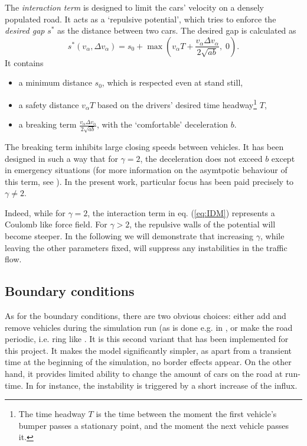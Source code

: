 The \emph{interaction term} is designed to limit the cars' velocity on a densely populated road. It acts as a `repulsive potential', which tries to enforce the \emph{desired gap} $s^*$ as the distance between two cars. The desired gap is calculated as
\begin{equation}
s^*(v_\alpha, \Delta v_\alpha) = s_0 + \max\left(v_\alpha T + \frac{v_\alpha \Delta v_\alpha}{2\sqrt{ab}},\;0\right).
\label{eq:desired_gap}
\end{equation}
It contains
\begin{itemize}
    \item a minimum distance $s_0$, which is respected even at stand still,
    \item a safety distance $v_\alpha T$ based on the drivers' desired time headway\footnote{The time headway $T$ is the time between the moment the first vehicle's bumper passes a stationary point, and the moment the next vehicle passes it.} $T$,
    \item a breaking term $\frac{v_\alpha \Delta v_\alpha}{2\sqrt{ab}}$, with the `comfortable' deceleration $b$.
\end{itemize}
The breaking term inhibits large closing speeds between vehicles. It has been designed in such a way that for $\gamma = 2$, the deceleration does not exceed $b$ except in emergency situations (for more information on the asymtpotic behaviour of this term, see \cite{treiber1999}). In the present work, particular focus has been paid precisely to  $\gamma \ne 2$.

Indeed, while for $\gamma=2$, the interaction term in eq. (\ref{eq:IDM}) represents a Coulomb like force field. For $\gamma>2$, the repulsive walls of the potential will become steeper. In the following we will demonstrate that increasing $\gamma$, while leaving the other parameters fixed, will suppress any instabilities in the traffic flow.

\subsection{Boundary conditions}
As for the boundary conditions, there are two obvious choices: either add and remove vehicles during the simulation run (as is done e.g. in \cite{treiber1999}, or make the road periodic, i.e. ring like \cite{treiber2015}. It is this second variant that has been implemented for this project. It makes the model significantly simpler, as apart from a transient time at the beginning of the simulation, no border effects appear. On the other hand, it provides limited ability to change the amount of cars on the road at run-time. In \cite{treiber1999, treiber2006} for instance, the instability is triggered by a short increase of the influx.

